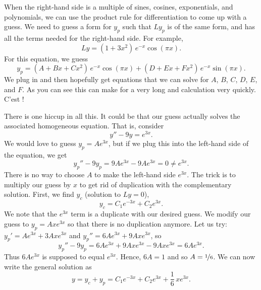 \medskip

When the right-hand side is a multiple of sines, cosines, exponentials,
and polynomials, we can use the product rule
for differentiation to come up with a guess.  We
need to guess a
form for $y_p$ such that $Ly_p$ is of the same form, and 
has all the terms needed for 
the right-hand side.
For example,
\begin{equation*}
Ly = (1+3x^2)\,e^{-x}\cos (\pi x) .
\end{equation*}
For this equation, we guess
\begin{equation*}
y_p = (A + Bx + Cx^2)\,e^{-x} \cos (\pi x) + 
(D + Ex + Fx^2)\,e^{-x} \sin (\pi x) .
\end{equation*}
We plug in and then hopefully get equations that we can solve for
$A$, $B$, $C$, $D$, $E$, and $F$.
As you can see this can make for a very long and
calculation very quickly.  C'est ! %

\medskip

There is one hiccup in all this.  It could be that our guess actually
solves the associated homogeneous equation.  That is, consider
\begin{equation*}
y'' - 9y = e^{3x} .
\end{equation*}
We would love to guess $y_p = Ae^{3x}$, but if we plug this into the
left-hand side of the equation, we get
\begin{equation*}
y_p''-9y_p = 9Ae^{3x} - 9Ae^{3x} = 0 \not= e^{3x} .
\end{equation*}
There is no way to choose $A$ to make the left-hand side $e^{3x}$.
The trick
is to multiply our guess by $x$ to get rid of duplication with the
complementary solution.  First, we find $y_c$ (solution to $Ly =
0$),
\begin{equation*}
y_c = C_1 e^{-3x} + C_2 e^{3x} .
\end{equation*}
We note that the $e^{3x}$ term is a duplicate with our desired guess.
We modify our guess to $y_p = Axe^{3x}$ so that there is no
duplication anymore.  Let us try:
$y_p' = Ae^{3x} + 3Axe^{3x}$ and 
$y_p'' = 6Ae^{3x} + 9Axe^{3x}$, so
\begin{equation*}
y_p'' -9y_p = 6Ae^{3x} + 9Axe^{3x} - 9Axe^{3x} = 
6Ae^{3x} .
\end{equation*}
Thus $6Ae^{3x}$ is supposed to equal $e^{3x}$.  Hence,
$6A = 1$ and so $A=\nicefrac{1}{6}$.  We can now write the general
solution as
\begin{equation*}
y = y_c + y_p = 
C_1 e^{-3x} + C_2 e^{3x} + \frac{1}{6}\,xe^{3x} .
\end{equation*}


